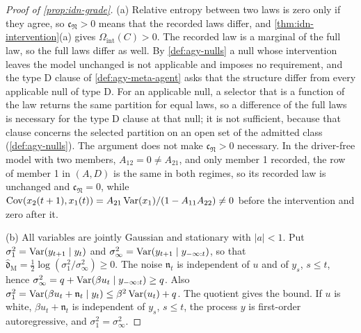 \begin{proof}[Proof of \cref{prop:idn-grade}]
(a) Relative entropy between two laws is zero only if they agree, so $\mathfrak c_{\mathfrak N}>0$ means that the recorded laws differ, and \cref{thm:idn-intervention}(a) gives $\Omega_{\mathrm{int}}(C)>0$. The recorded law is a marginal of the full law, so the full laws differ as well. By \cref{def:agy-nulls} a null whose intervention leaves the model unchanged is not applicable and imposes no requirement, and the type D clause of \cref{def:agy-meta-agent} asks that the structure differ from every applicable null of type D. For an applicable null, a selector that is a function of the law returns the same partition for equal laws, so a difference of the full laws is necessary for the type D clause at that null; it is not sufficient, because that clause concerns the selected partition on an open set of the admitted class (\cref{def:agy-nulls}). The argument does not make $\mathfrak c_{\mathfrak N}>0$ necessary. In the driver-free model with two members, $A_{12}=0\neq A_{21}$, and only member 1 recorded, the row of member 1 in $(A,D)$ is the same in both regimes, so its recorded law is unchanged and $\mathfrak c_{\mathfrak N}=0$, while $\operatorname{Cov}(x_2(t+1),x_1(t))=A_{21}\operatorname{Var}(x_1)/(1-A_{11}A_{22})\neq0$ before the intervention and zero after it.

(b) All variables are jointly Gaussian and stationary with $|a|<1$. Put $\sigma_1^2=\operatorname{Var}(y_{t+1}\mid y_t)$ and $\sigma_\infty^2=\operatorname{Var}(y_{t+1}\mid y_{-\infty:t})$, so that $\hat{\mathfrak d}_{\mathrm M}=\tfrac12\log(\sigma_1^2/\sigma_\infty^2)\ge0$. The noise $\mathfrak n_t$ is independent of $u$ and of $y_s$, $s\le t$, hence $\sigma_\infty^2=q+\operatorname{Var}(\beta u_t\mid y_{-\infty:t})\ge q$. Also $\sigma_1^2=\operatorname{Var}(\beta u_t+\mathfrak n_t\mid y_t)\le\beta^2\operatorname{Var}(u_t)+q$. The quotient gives the bound. If $u$ is white, $\beta u_t+\mathfrak n_t$ is independent of $y_s$, $s\le t$, the process $y$ is first-order autoregressive, and $\sigma_1^2=\sigma_\infty^2$.


\end{proof}
